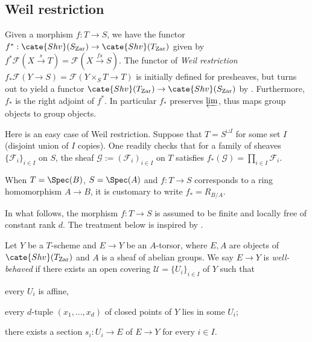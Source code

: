 \documentclass[a4paper,10pt]{article}
\begin{document}
\subsection{Weil restriction}\label{sec:Weil-restriction}
Given a morphism $f: T \to S$, we have the functor $f^*: \cate{Shv}(S_\mathrm{Zar}) \to \cate{Shv}(T_\mathrm{Zar})$ given by $f^* \mathcal{F}(X \xrightarrow{s} T) = \mathcal{F}(X \xrightarrow{fs} S)$. The functor of \emph{Weil restriction} $f_*\mathcal{F}(Y \to S) = \mathcal{F}(Y \times_S T \to T)$ is initially defined for presheaves, but turns out to yield a functor $\cate{Shv}(T_\mathrm{Zar}) \to \cate{Shv}(S_\mathrm{Zar})$ by \cite[p.194, Proposition 3]{BLR90}. Furthermore, $f_*$ is the right adjoint of $f^*$. In particular $f_*$ preserves $\varprojlim$, thus maps group objects to group objects. 

\begin{remark}\label{rem:easy-Weil}
	Here is an easy case of Weil restriction. Suppose that $T = S^{\sqcup I}$ for some set $I$ (disjoint union of $I$ copies). One readily checks that for a family of sheaves $\{\mathcal{F}_i\}_{i \in I}$ on $S$, the sheaf $\mathcal{G} := (\mathcal{F}_i)_{i \in I}$ on $T$ satisfies $f_* (\mathcal{G}) = \prod_{i \in I} \mathcal{F}_i$.
\end{remark}

\begin{notation}\label{nota:Weil-restriction}
	When $T=\Spec(B)$, $S=\Spec(A)$ and $f: T \to S$ corresponds to a ring homomorphism $A \to B$, it is customary to write $f_* = R_{B/A}$.
\end{notation}

In what follows, the morphism $f: T \to S$ is assumed to be finite and locally free of constant rank $d$. The treatment below is inspired by \cite{113891}.
\begin{definition}\label{def:well-behaved}
	Let $Y$ be a $T$-scheme and $E \to Y$ be an $A$-torsor, where $E,A$ are objects of $\cate{Shv}(T_\mathrm{Zar})$ and $A$ is a sheaf of abelian groups. We say $E \to Y$ is \emph{well-behaved} if there exists an open covering $\mathcal{U} = \{U_i\}_{i \in I}$ of $Y$ such that
	\begin{compactitem}
		\item every $U_i$ is affine,
		\item every $d$-tuple $(x_1, \ldots, x_d)$ of closed points of $Y$ lies in some $U_i$;
		\item there exists a section $s_i: U_i \to E$ of $E \to Y$ for every $i \in I$.
	\end{compactitem}
\end{definition}
\end{document}
